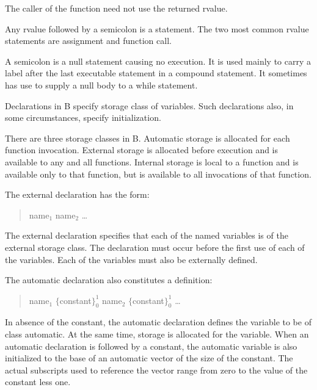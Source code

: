 \documentclass[12pt]{report}
\begin{document}
The caller of the function need not use the returned rvalue.


Any rvalue followed by a semicolon is a statement. The two most common
rvalue statements are assignment and function call.


A semicolon is a null statement causing no execution. It is used
mainly to carry a label after the last executable statement in a
compound statement. It sometimes has use to supply a null body to a
while statement.


Declarations in B specify storage class of variables. Such
declarations also, in some circumstances, specify initialization.

There are three storage classes in B. Automatic storage is allocated
for each function invocation. External storage is allocated before
execution and is available to any and all functions. Internal storage
is local to a function and is available only to that function, but is
available to all invocations of that function.


The external declaration has the form:
\begin{quote}
   name$_1$ \token{,} name$_2$ \ldots \token{;}
\end{quote}

The external declaration specifies that each of the named variables is
of the external storage class. The declaration must occur before the
first use of each of the variables. Each of the variables must also be
externally defined.


The automatic declaration also constitutes a definition:
\begin{quote}
   name$_1^{}$ $\{$constant$\}_0^1$ \token{,}
name$_2^{}$ $\{$constant$\}_0^1$ \ldots \token{;}
\end{quote}
  
In absence of the constant, the automatic declaration defines the
variable to be of class automatic. At the same time, storage is
allocated for the variable. When an automatic declaration is followed
by a constant, the automatic variable is also initialized to the base
of an automatic vector of the size of the constant. The actual
subscripts used to reference the vector range from zero to the value
of the constant less one.
          
\end{document}
